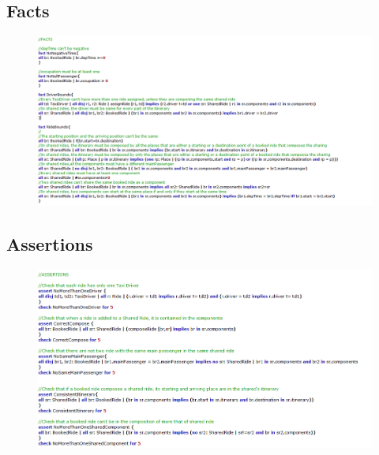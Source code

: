 \subsection{Facts}
\begin{figure}[h!]
		\centering
		\includegraphics[height=0.65\textwidth]{"myTaxiServiceImg/Alloy/Facts"}
\end{figure}

\newpage
\subsection{Assertions}
\begin{figure}[h!]
		\centering
		\includegraphics[height=0.65\textwidth]{"myTaxiServiceImg/Alloy/Assertions"}
\end{figure}


